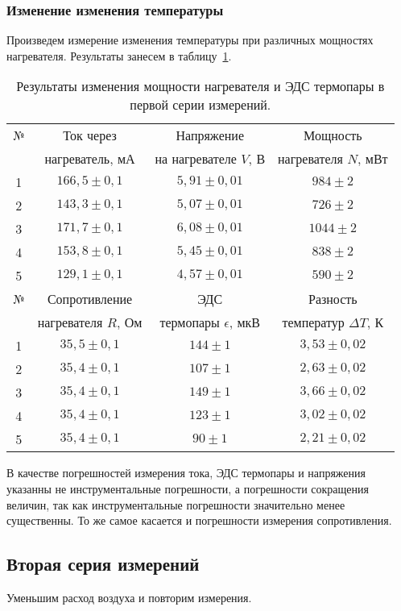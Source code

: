\documentclass[a4paper,11pt]{article}
\begin{document}
\subsubsection{Изменение изменения температуры}
Произведем измерение изменения температуры при различных мощностях нагревателя.\newline
Результаты занесем в таблицу~\ref{table:tab2}.
\begin{table}[h!]
\centering
\begin{tabular}{ ||c|c|c|c|| }
  \hline
  № & Ток через & Напряжение & Мощность \\
   & нагреватель, $мА$ & на нагревателе $V$, $В$ & нагревателя $N$, $мВт$ \\
  \hline
  1 & $166,5 \pm 0,1$ & $5,91 \pm 0,01$ & $984 \pm 2$ \\
  2 & $143,3 \pm 0,1$ & $5,07 \pm 0,01$ & $726 \pm 2$ \\
  3 & $171,7 \pm 0,1$ & $6,08 \pm 0,01$ & $1044 \pm 2$ \\
  4 & $153,8 \pm 0,1$ & $5,45 \pm 0,01$ & $838 \pm 2$ \\
  5 & $129,1 \pm 0,1$ & $4,57 \pm 0,01$ & $590 \pm 2$ \\
  \hline\hline
  № & Сопротивление & ЭДС & Разность \\
   & нагревателя $R$, $Ом$ & термопары $\epsilon$, $мкВ$ & температур $\Delta T$, $К$ \\
  \hline
  1 & $35,5 \pm 0,1$ & $144 \pm 1$ & $3,53 \pm 0,02$ \\
  2 & $35,4 \pm 0,1$ & $107 \pm 1$ & $2,63 \pm 0,02$ \\
  3 & $35,4 \pm 0,1$ & $149 \pm 1$ & $3,66 \pm 0,02$ \\
  4 & $35,4 \pm 0,1$ & $123 \pm 1$ & $3,02 \pm 0,02$ \\
  5 & $35,4 \pm 0,1$ & $90 \pm 1$ & $2,21 \pm 0,02$ \\
  \hline
\end{tabular}
\caption{Результаты изменения мощности нагревателя и ЭДС термопары в первой серии измерений.}
\label{table:tab2}
\end{table}
\newline
В качестве погрешностей измерения тока, ЭДС термопары и напряжения указанны не инструментальные погрешности, а погрешности сокращения величин, так как инструментальные погрешности значительно менее существенны. То же самое касается и погрешности измерения сопротивления.
\subsection{Вторая серия измерений}
Уменьшим расход воздуха и повторим измерения.
\end{document}
